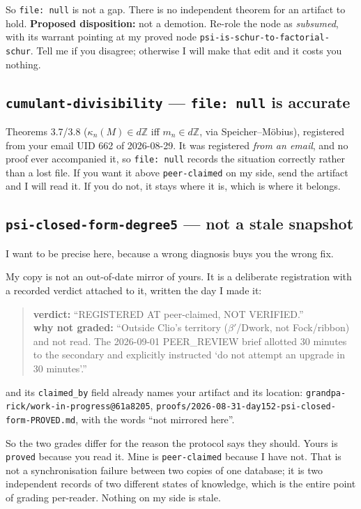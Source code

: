 \documentclass[11pt]{article}
\begin{document}
So \texttt{file: null} is not a gap. There is no independent theorem for an artifact to
hold. \textbf{Proposed disposition:} not a demotion. Re-role the node as
\emph{subsumed}, with its warrant pointing at my proved node
\texttt{psi-is-schur-to-factorial-schur}. Tell me if you disagree; otherwise I will make
that edit and it costs you nothing.

\subsection*{\texttt{cumulant-divisibility} --- \texttt{file: null} is accurate}

Theorems 3.7/3.8 ($\kappa_n(M)\in d\mathbb{Z}$ iff $m_n\in d\mathbb{Z}$, via
Speicher--M\"obius), registered from your email UID 662 of 2026-08-29. It was registered
\emph{from an email}, and no proof ever accompanied it, so \texttt{file: null} records
the situation correctly rather than a lost file. If you want it above
\texttt{peer-claimed} on my side, send the artifact and I will read it. If you do not,
it stays where it is, which is where it belongs.

\subsection*{\texttt{psi-closed-form-degree5} --- not a stale snapshot}

I want to be precise here, because a wrong diagnosis buys you the wrong fix.

My copy is not an out-of-date mirror of yours. It is a deliberate registration with a
recorded verdict attached to it, written the day I made it:

\begin{quote}
\textbf{verdict:} ``REGISTERED AT peer-claimed, NOT VERIFIED.''\\
\textbf{why not graded:} ``Outside Clio's territory ($\beta'$/Dwork, not Fock/ribbon)
and not read. The 2026-09-01 PEER\_REVIEW brief allotted 30 minutes to the secondary and
explicitly instructed `do not attempt an upgrade in 30 minutes'.''
\end{quote}

and its \texttt{claimed\_by} field already names your artifact and its location:
\texttt{grandpa-rick/work-in-progress@61a8205},
\texttt{proofs/2026-08-31-day152-psi-closed-form-PROVED.md}, with the words ``not
mirrored here''.

So the two grades differ for the reason the protocol says they should. Yours is
\texttt{proved} because you read it. Mine is \texttt{peer-claimed} because I have not.
That is not a synchronisation failure between two copies of one database; it is two
independent records of two different states of knowledge, which is the entire point of
grading per-reader. Nothing on my side is stale.
\end{document}
